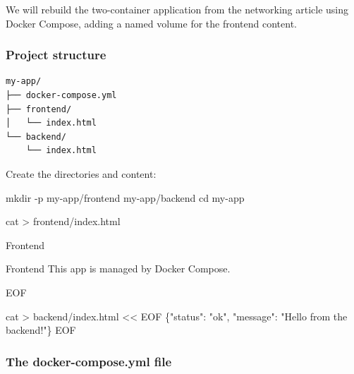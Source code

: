 \documentclass[11pt,american,a4paper,openany]{book}
\newenvironment{Shaded}{}{}
\newcommand{\NormalTok}[1]{#1}
\begin{document}
We will rebuild the two-container application from the networking
article using Docker Compose, adding a named volume for the frontend
content.

\subsubsection{Project structure}\label{project-structure}

\begin{verbatim}
my-app/
├── docker-compose.yml
├── frontend/
│   └── index.html
└── backend/
    └── index.html
\end{verbatim}

Create the directories and content:

\begin{Shaded}
\begin{Highlighting}[]
\NormalTok{mkdir {-}p my{-}app/frontend my{-}app/backend}
\NormalTok{cd my{-}app}

\NormalTok{cat \textgreater{} frontend/index.html }

\NormalTok{  Frontend}
  
\NormalTok{    Frontend}
\NormalTok{    This app is managed by Docker Compose.}
  

\NormalTok{EOF}

\NormalTok{cat \textgreater{} backend/index.html \textless{}\textless{} \textquotesingle{}EOF\textquotesingle{}}
\NormalTok{\{"status": "ok", "message": "Hello from the backend!"\}}
\NormalTok{EOF}
\end{Highlighting}
\end{Shaded}

\subsubsection{The docker-compose.yml
file}\label{the-docker-compose.yml-file-1}
\end{document}
